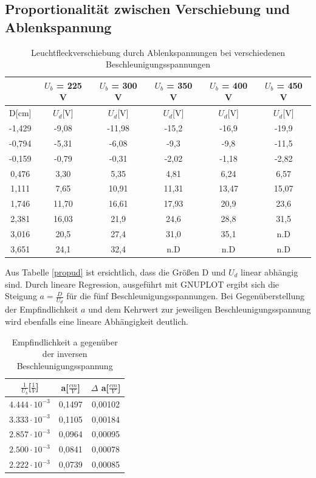 \subsection{Proportionalität zwischen Verschiebung und Ablenkspannung}

\renewcommand{\arraystretch}{1.5}
\begin{table}[htbp]
\begin{tabular}{c|ccccc}
\centering
  & $U_b$ = 225 V &  $U_b$ = 300 V &  $U_b$ = 350 V &  $U_b$ = 400 V &  $U_b$ = 450 V\\
 \hline
 D[cm] & $U_d$[V] & $U_d$[V] & $U_d$[V] & $U_d$[V] & $U_d$[V]\\
 \hline
-1,429	&-9,08	&-11,98	&-15,2	&-16,9&	-19,9\\
-0,794	&-5,31	&-6,08	&-9,3	&-9,8&	-11,5\\
-0,159	&-0,79	&-0,31	&-2,02	&-1,18&	-2,82\\
0,476	&3,30	&5,35	&4,81	&6,24&	6,57\\
1,111	&7,65	&10,91	&11,31	&13,47&	15,07\\
1,746	&11,70	&16,61	&17,93	&20,9	&23,6\\
2,381	&16,03	&21,9	&24,6	&28,8	&31,5\\
3,016	&20,5	&27,4	&31,0	&35,1	&n.D\\
3,651	&24,1	&32,4	&n.D	&n.D	&n.D\\
 \end{tabular}
\caption{Leuchtfleckverschiebung durch Ablenkspannungen bei verschiedenen Beschleunigungsspannungen}
\label{propud}
\end{table}
\renewcommand{\arraystretch}{1}

Aus Tabelle \eqref{propud} ist ersichtlich, dass die Größen D und $U_d$ linear abhängig sind. Durch lineare Regression, 
ausgeführt mit GNUPLOT ergibt sich die Steigung $a = \frac{D}{U_d}$ für die fünf Beschleunigungsspannungen. Bei 
Gegenüberstellung der Empfindlichkeit $a$ und dem Kehrwert zur jeweiligen Beschleunigungsspannung wird ebenfalls eine
lineare Abhängigkeit deutlich.
\renewcommand{\arraystretch}{1.5}
\begin{table}[htbp]
 \begin{tabular}{c|c|c}
  $\frac{1}{U_b}$[$\frac1V$] & a[$\frac{cm}{V}$] & $\Delta$ a[$\frac{cm}{V}$]\\
  \hline
  $4.444 \cdot 10^{-3}$ & 0,1497 & 0,00102 \\
  $3.333 \cdot 10^{-3}$ & 0,1105 & 0,00184 \\
  $2.857 \cdot 10^{-3}$ & 0,0964 & 0,00095 \\
  $2.500 \cdot 10^{-3}$ & 0,0841 & 0,00078 \\
  $2.222 \cdot 10^{-3}$ & 0,0739 & 0,00085 \\
 \end{tabular}
\label{propua}
\centering
\caption{Empfindlichkeit a gegenüber der inversen Beschleunigungsspannung}
\end{table}
\renewcommand{\arraystretch}{1}

